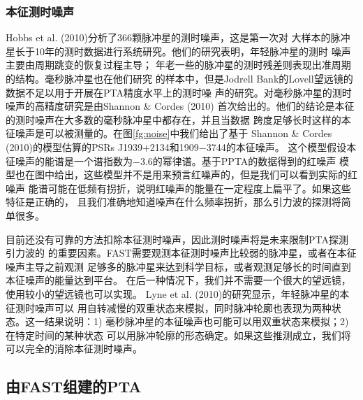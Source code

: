 \subsubsection{本征测时噪声}

Hobbs et al. (2010)\supercite{hlk10}分析了366颗脉冲星的测时噪声，这是第一次对
大样本的脉冲星长于10年的测时数据进行系统研究。他们的研究表明，年轻脉冲星的测时
噪声主要由周期跳变的恢复过程主导；
年老一些的脉冲星的测时残差则表现出准周期的结构。毫秒脉冲星也在他们研究
的样本中，但是Jodrell Bank的Lovell望远镜的数据不足以用于开展在PTA精度水平上的测时噪
声的研究。对毫秒脉冲星的测时噪声的高精度研究是由Shannon \& Cordes (2010)\supercite{Shannon10}
首次给出的。他们的结论是本征的测时噪声在大多数的毫秒脉冲星中都存在，并且当数据
跨度足够长时这样的本征噪声是可以被测量的。在图\ref{fg:noise}中我们给出了基于
Shannon \& Cordes (2010)的模型估算的PSRs J1939$+$2134和1909$-$3744的本征噪声。
这个模型假设本征噪声的能谱是一个谱指数为$-3.6$的幂律谱。基于PPTA的数据得到的红噪声
模型也在图中给出，这些模型并不是用来预言红噪声的，但是我们可以看到实际的红噪声
能谱可能在低频有拐折，说明红噪声的能量在一定程度上扁平了。如果这些特征是正确的，
且我们准确地知道噪声在什么频率拐折，那么引力波的探测将简单很多。

目前还没有可靠的方法扣除本征测时噪声，因此测时噪声将是未来限制PTA探测引力波的
的重要因素。FAST需要观测本征测时噪声比较弱的脉冲星，或者在本征噪声主导之前观测
足够多的脉冲星来达到科学目标，或者观测足够长的时间直到本征噪声的能量达到平台。
在后一种情况下，我们并不需要一个很大的望远镜，使用较小的望远镜也可以实现。
Lyne et al. (2010)\supercite{lhk+10}的研究显示，年轻脉冲星的本征测时噪声可以
用自转减慢的双重状态来模拟，同时脉冲轮廓也表现为两种状态。这一结果说明：1) 
毫秒脉冲星的本征噪声也可能可以用双重状态来模拟；2) 在特定时间的某种状态
可以用脉冲轮廓的形态确定。如果这些推测成立，我们将可以完全的消除本征测时噪声。

\subsection{由FAST组建的PTA}

